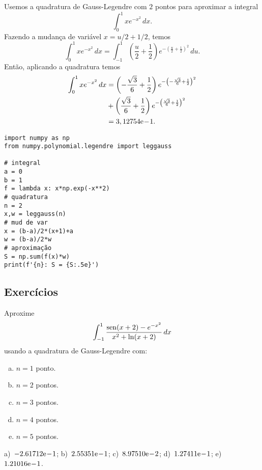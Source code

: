 \begin{ex}
Usemos a quadratura de Gauss-Legendre com $2$ pontos para aproximar a integral
\begin{equation}
  \int_0^{1} xe^{-x^2}\,dx.
\end{equation}
Fazendo a mudança de variável $x=u/2 + 1/2$, temos
\begin{equation}
  \int_0^{1} xe^{-x^2}\,dx = \int_{-1}^1 \left(\frac{u}{2}+\frac{1}{2}\right)e^{-\left(\frac{u}{2}+\frac{1}{2}\right)^2}\,du.
\end{equation}
Então, aplicando a quadratura temos
\begin{subequations}
  \begin{align}
    \int_0^{1} xe^{-x^2}\,dx &= \left(-\frac{\sqrt{3}}{6}+\frac{1}{2}\right)e^{-\left(-\frac{\sqrt{3}}{6}+\frac{1}{2}\right)^2} \nonumber\\
                             &+ \left(\frac{\sqrt{3}}{6}+\frac{1}{2}\right)e^{-\left(\frac{\sqrt{3}}{6}+\frac{1}{2}\right)^2} \\
                             &= 3,12754\mathrm{e}\!-\!1.
\end{align}
\end{subequations}

\begin{lstlisting}
import numpy as np
from numpy.polynomial.legendre import leggauss

# integral
a = 0
b = 1
f = lambda x: x*np.exp(-x**2)
# quadratura
n = 2
x,w = leggauss(n)
# mud de var
x = (b-a)/2*(x+1)+a
w = (b-a)/2*w
# aproximação
S = np.sum(f(x)*w)
print(f'{n}: S = {S:.5e}')
\end{lstlisting}
\end{ex}

\subsection{Exercícios}

\begin{exer}
  Aproxime
  \begin{equation}
    \int_{-1}^1 \frac{\operatorname{sen}(x+2)-e^{-x^2}}{x^2+\ln(x+2)}\,dx
  \end{equation}
usando a quadratura de Gauss-Legendre com:
\begin{enumerate}[a)]
\item $n=1$ ponto.
\item $n=2$ pontos.
\item $n=3$ pontos.
\item $n=4$ pontos.
\item $n=5$ pontos.
\end{enumerate}
\end{exer}
\begin{resp}
  a)~$-2.61712\mathrm{e}\!-\!1$; b)~$2.55351\mathrm{e}\!-\!1$; c)~$8.97510\mathrm{e}\!-\!2$; d)~$1.27411\mathrm{e}\!-\!1$; e)~$1.21016\mathrm{e}\!-\!1$.
\end{resp}

